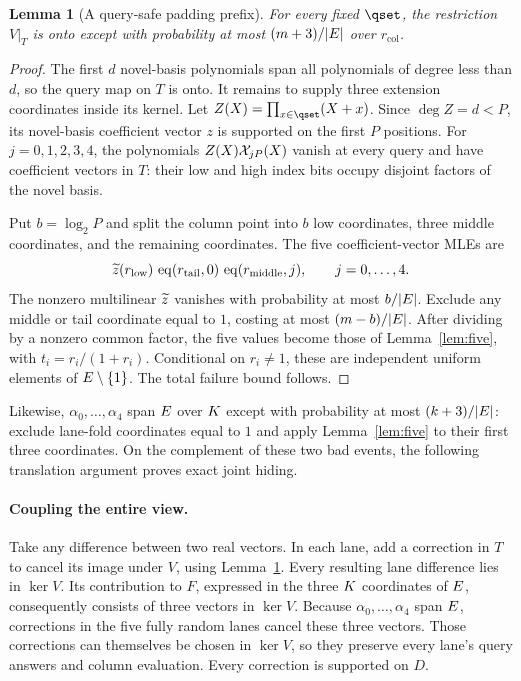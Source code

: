 \documentclass[11pt]{article}
\newtheorem{lemma}[theorem]{Lemma}
\begin{document}
\begin{lemma}[A query-safe padding prefix]\label{lem:prefix}
For every fixed $\qset$, the restriction $V|_T$ is onto except with probability at most $(m+3)/|E|$ over $r_{\mathrm{col}}$.
\end{lemma}
\begin{proof}
The first $d$ novel-basis polynomials span all polynomials of degree less than $d$, so the query map on $T$ is onto. It remains to supply three extension coordinates inside its kernel. Let $Z(X)=\prod_{x\in\qset}(X+x)$. Since $\deg Z=d<P$, its novel-basis coefficient vector $z$ is supported on the first $P$ positions. For $j=0,1,2,3,4$, the polynomials $Z(X)\mathcal{X}_{jP}(X)$ vanish at every query and have coefficient vectors in $T$: their low and high index bits occupy disjoint factors of the novel basis.

Put $b=\log_2 P$ and split the column point into $b$ low coordinates, three middle coordinates, and the remaining coordinates. The five coefficient-vector MLEs are
\[
 \widetilde{z}(r_{\mathrm{low}})\,
 \operatorname{eq}(r_{\mathrm{tail}},0)\,
 \operatorname{eq}(r_{\mathrm{middle}},j),\qquad j=0,\ldots,4.
\]
The nonzero multilinear $\widetilde{z}$ vanishes with probability at most $b/|E|$. Exclude any middle or tail coordinate equal to $1$, costing at most $(m-b)/|E|$. After dividing by a nonzero common factor, the five values become those of Lemma~\ref{lem:five}, with $t_i=r_i/(1+r_i)$. Conditional on $r_i\ne1$, these are independent uniform elements of $E\setminus\{1\}$. The total failure bound follows.
\end{proof}

Likewise, $\alpha_0,\ldots,\alpha_4$ span $E$ over $K$ except with probability at most $(k+3)/|E|$: exclude lane-fold coordinates equal to $1$ and apply Lemma~\ref{lem:five} to their first three coordinates. On the complement of these two bad events, the following translation argument proves exact joint hiding.

\paragraph{Coupling the entire view.} Take any difference between two real vectors. In each lane, add a correction in $T$ to cancel its image under $V$, using Lemma~\ref{lem:prefix}. Every resulting lane difference lies in $\ker V$. Its contribution to $F$, expressed in the three $K$ coordinates of $E$, consequently consists of three vectors in $\ker V$. Because $\alpha_0,\ldots,\alpha_4$ span $E$, corrections in the five fully random lanes cancel these three vectors. Those corrections can themselves be chosen in $\ker V$, so they preserve every lane's query answers and column evaluation. Every correction is supported on $D$.
\end{document}
